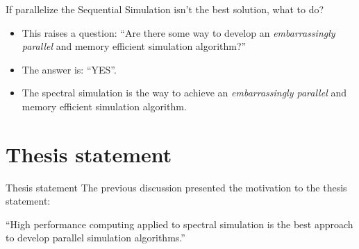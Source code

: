\begin{frame}{If parallelize the Sequential Simulation isn't the best solution, what to do?}
	\begin{itemize}
    	\item This raises a question: ``Are there some way to develop an  \textit{embarrassingly parallel} and memory efficient simulation algorithm?''
        \item The answer is: ``YES''.
        \item The spectral simulation is the way to achieve an \textit{embarrassingly parallel} and memory efficient simulation algorithm. 
    \end{itemize}
\end{frame}


\section {Thesis statement}
\begin{frame}{Thesis statement}
The previous discussion presented the motivation to the thesis statement:


\begin{block}{}
``High performance computing applied to spectral simulation is the best approach to develop parallel simulation algorithms.''
\end{block}

\end{frame}
